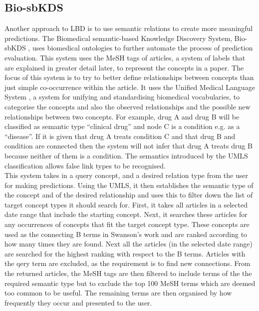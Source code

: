 \documentclass{l4proj}
\begin{document}
\subsection{Bio-sbKDS}

Another approach to LBD is to use semantic relations to create more meaningful predictions. The Biomedical semantic-based Knowledge Discovery System, Bio-sbKDS \citep{hu_semantic-based_2005}, uses biomedical ontologies to further automate the process of prediction evaluation. This system uses the MeSH tags of articles, a system of labels that are explained in greater detail later, to represent the concepts in a paper. The focus of this system is to try to better define relationships between concepts than just simple co-occurrence within the article. It uses the Unified Medical Language System \citep{umls}, a system for unifying and standardising biomedical vocabularies, to categorise the concepts and also the observed relationships and the possible new relationships between two concepts. For example, drug A  and drug B will be classified as semantic type ``clinical drug'' and node C is a condition e.g. as a  ``disease''. If it is given that drug A treats condition C and that drug B and condition are connected then the system will not infer that drug A treats drug B because neither of them is a condition. The semantics introduced by the UMLS classification allows false link types to be recognised. \\

This system takes in a query concept, and a desired relation type from the user for making predictions. Using the UMLS, it then establishes the semantic type of the concept and of the desired relationship and uses this to filter down the list of target concept types it should search for. First, it takes all articles in a selected date range that include the starting concept. Next, it searches these articles for any occurrences of concepts that fit the target concept type. These concepts are used as the connecting B terms in Swanson's work and are ranked according to how many times they are found. Next all the articles (in the selected date range) are searched for the highest ranking with respect to the B terms. Articles with the qery term are excluded, as the requirement is to find new connections. From the returned articles, the MeSH tags are then filtered to include terms of the the required semantic type but to exclude the top 100 MeSH terms which are deemed too common to be useful. The remaining terms are then organised by how frequently they occur and presented to the user. \\
\end{document}
